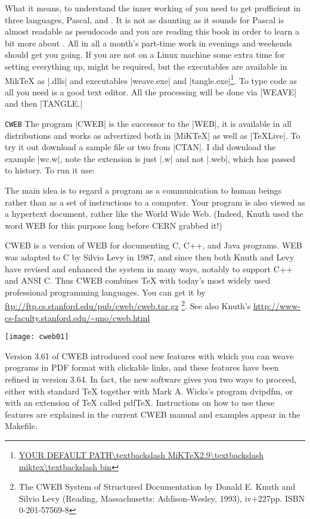 What it means, to understand the inner working of \tex you need to get profficient in three languages, Pascal, \tex and \web. It is not as daunting as it sounds for Pascal is almost readable as pseudocode and you are reading this book in order to learn a bit more about \tex. All in all a month's part-time work in evenings and weekends should get you going. If you are not on a Linux machine some extra time for setting everything up, might be required, but the executables are available in MikTeX as |.dlls| and executables |weave.exe| and |tangle.exe|\footnote{\url{YOUR DEFAULT PATH\textbackslash MiKTeX2.9\textbackslash miktex\textbackslash bin}}. To type code as \web all you need is a good text editor. All the processing will be done via |WEAVE| and then |TANGLE.|


\texttt{CWEB} The program |CWEB| is the successor to the |WEB|, it is available in all distributions and works as advertized both in |MiKTeX| as well as |TeXLive|. To try it out download a sample file or two from |CTAN|. I did download the example |wc.w|, note the extension is just |.w| and not |.web|, which has passed to history.  To run it use:

The main idea is to regard a program as a communication to human beings rather than as a set of instructions to a computer. Your program is also viewed as a hypertext document, rather like the World Wide Web. (Indeed, Knuth used the word WEB for this purpose long before CERN grabbed it!)

CWEB is a version of WEB for documenting C, C++, and Java programs. WEB was adapted to C by Silvio Levy in 1987, and since then both Knuth and Levy have revised and enhanced the system in many ways, notably to support C++ and ANSI C. Thus CWEB combines TeX with today's most widely used professional programming languages. You can get it by \url{ftp://ftp.cs.stanford.edu/pub/cweb/cweb.tar.gz}
\footnote{The CWEB System of Structured Documentation
by Donald E. Knuth and Silvio Levy (Reading, Massachusetts: Addison-Wesley, 1993), iv+227pp.
ISBN 0-201-57569-8}. See also Knuth's \url{http://www-cs-faculty.stanford.edu/~uno/cweb.html}

\texttt{[image: cweb01]}

Version 3.61 of CWEB introduced cool new features with which you can weave programs in PDF format with clickable links, and these features have been refined in version 3.64. In fact, the new software gives you two ways to proceed, either with standard TeX together with Mark A. Wicks's program dvipdfm, or with an extension of TeX called pdfTeX. Instructions on how to use these features are explained in the current CWEB manual and examples appear in the Makefile.


